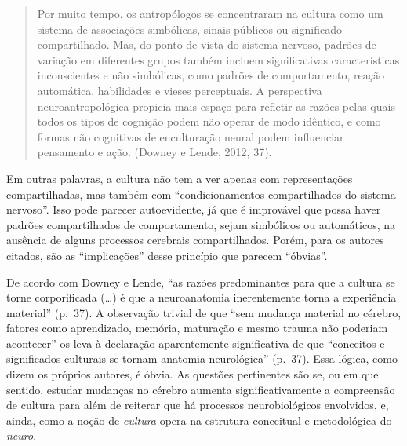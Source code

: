 \begin{quote}
Por muito tempo, os antropólogos se concentraram na cultura como um
sistema de associações simbólicas, sinais públicos ou significado
compartilhado. Mas, do ponto de vista do sistema nervoso, padrões de
variação em diferentes grupos também incluem significativas
características inconscientes e não simbólicas, como padrões de
comportamento, reação automática, habilidades e vieses perceptuais. A
perspectiva neuroantropológica propicia mais espaço para refletir as
razões pelas quais todos os tipos de cognição podem não operar de modo
idêntico, e como formas não cognitivas de enculturação neural podem
influenciar pensamento e ação. (Downey e Lende, 2012, 37).
\end{quote}

Em outras palavras, a cultura não tem a ver apenas com representações
compartilhadas, mas também com ``condicionamentos compartilhados do
sistema nervoso''. Isso pode parecer autoevidente, já que é improvável
que possa haver padrões compartilhados de comportamento, sejam
simbólicos ou automáticos, na ausência de alguns processos cerebrais
compartilhados. Porém, para os autores citados, são as ``implicações''
desse princípio que parecem ``óbvias''.

De acordo com Downey e Lende, ``as razões predominantes para que a
cultura se torne corporificada (\ldots{}) é que a neuroanatomia inerentemente
torna a experiência material'' (p.~37). A observação trivial de que ``sem
mudança material no cérebro, fatores como aprendizado, memória,
maturação e mesmo trauma não poderiam acontecer'' os leva à declaração
aparentemente significativa de que ``conceitos e significados culturais
se tornam anatomia neurológica'' (p.~37). Essa lógica, como dizem os
próprios autores, é óbvia. As questões pertinentes são se, ou em que
sentido, estudar mudanças no cérebro aumenta significativamente a
compreensão de cultura para além de reiterar que há processos
neurobiológicos envolvidos, e, ainda, como a noção de \emph{cultura}
opera na estrutura conceitual e metodológica do \emph{neuro}.

